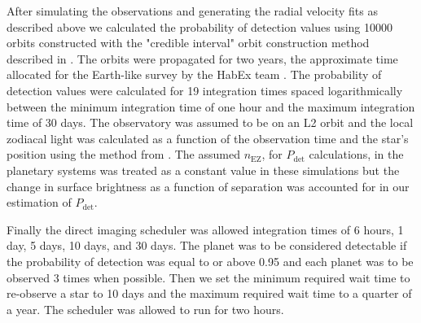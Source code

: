 After simulating the observations and generating the radial velocity fits as
described above we calculated the probability of detection values using 10000
orbits constructed with the "credible interval" orbit construction method
described in . The orbits were propagated for two years,
the approximate time allocated for the Earth-like survey by the HabEx team
\citep{gaudiHabitableExoplanetObservatory2020}. The probability of detection
values were calculated for 19 integration times spaced logarithmically between
the minimum integration time of one hour and the maximum integration time of 30
days. The observatory was assumed to be on an L2 orbit and the local zodiacal light
was calculated as a function of the observation time and the star's position using
the method from .
The assumed $n_\textrm{EZ}$, for $P_\textrm{det}$ calculations, in the
planetary systems was treated as a constant value in these simulations but the
change in surface brightness as a function of separation was accounted for in
our estimation of $P_\textrm{det}$.

Finally the direct imaging scheduler was allowed integration times of 6 hours,
1 day, 5 days, 10 days, and 30 days. The planet was to be considered detectable
if the probability of detection was equal to or above 0.95 and each planet was
to be observed 3 times when possible. Then we set the minimum required wait
time to re-observe a star to 10 days and the maximum required wait time to a
quarter of a year. The scheduler was allowed to run for two hours.

